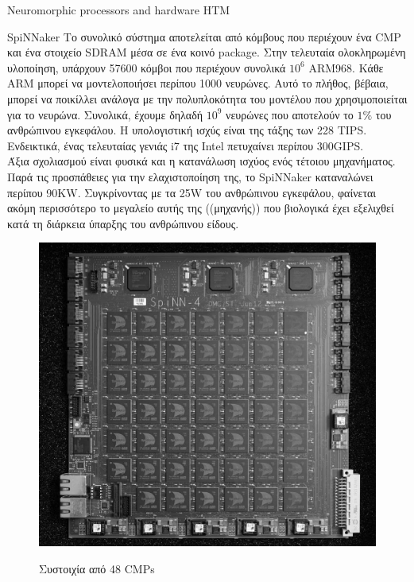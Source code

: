 \documentclass[a4paper,11pt]{article}
\begin{document}
\begin{section}{Neuromorphic processors and hardware HTM}
\begin{subsection}{SpiNNaker}
    Το συνολικό σύστημα αποτελείται από κόμβους που περιέχουν ένα CMP και ένα στοιχείο SDRAM μέσα σε ένα κοινό package. Στην τελευταία ολοκληρωμένη υλοποίηση, υπάρχουν 57600 κόμβοι που περιέχουν συνολικά $10^6$ ARM968. Κάθε ΑRM μπορεί να μοντελοποιήσει περίπου 1000 νευρώνες. Αυτό το πλήθος, βέβαια, μπορεί να ποικίλλει ανάλογα με την πολυπλοκότητα του μοντέλου που χρησιμοποιείται για το νευρώνα. Συνολικά, έχουμε δηλαδή $10^9$ νευρώνες που αποτελούν το $1\%$ του ανθρώπινου εγκεφάλου. Η υπολογιστική ισχύς είναι της τάξης των 228 TIPS. Ενδεικτικά, ένας τελευταίας γενιάς i7 της Intel πετυχαίνει περίπου 300GIPS.\\
    Άξια σχολιασμού είναι φυσικά και η κατανάλωση ισχύος ενός τέτοιου μηχανήματος. Παρά τις προσπάθειες για την ελαχιστοποίηση της, το SpiNNaker καταναλώνει περίπου 90ΚW. Συγκρίνοντας με τα 25W του ανθρώπινου εγκεφάλου, φαίνεται ακόμη περισσότερο το μεγαλείο αυτής της ((μηχανής)) που βιολογικά έχει εξελιχθεί κατά τη διάρκεια ύπαρξης του ανθρώπινου είδους.\\
    \begin{figure}[H]
      \centering%
      {\includegraphics[width=0.4\columnwidth,clip=true]{pics/Spinnaker.jpg}}
      \caption{Συστοιχία από 48 CMPs} \label{fig:Spinnaker}
    \end{figure}


\end{subsection}
\end{section}
\end{document}

